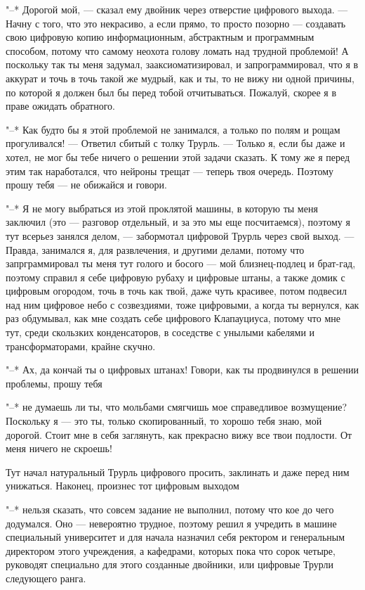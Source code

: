 "--* Дорогой мой, --- сказал ему двойник через отверстие
цифрового выхода. --- Начну с того, что это некрасиво, а если
прямо, то просто позорно --- создавать свою цифровую копию
информационным, абстрактным и программным способом, потому
что самому неохота голову ломать над трудной проблемой! А
поскольку так ты меня задумал, зааксиоматизировал, и
запрограммировал, что я в аккурат и точь в точь такой же
мудрый, как и ты, то не вижу ни одной причины, по которой я
должен был бы перед тобой отчитываться. Пожалуй, скорее я в
праве ожидать обратного.

"--* Как будто бы я этой проблемой не занимался, а только
по полям и рощам прогуливался! --- Ответил сбитый с толку
Трурль. --- Только я, если бы даже и хотел, не мог бы тебе
ничего о решении этой задачи сказать. К тому же я перед этим
так наработался, что нейроны трещат --- теперь твоя очередь.
Поэтому прошу тебя --- не обижайся и говори.

"--* Я не могу выбраться из этой проклятой машины, в
которую ты меня заключил (это --- разговор отдельный, и за это
мы еще посчитаемся), поэтому я тут всерьез занялся делом, --- забормотал
цифровой Трурль через свой выход. --- Правда,
занимался я, для развлечения, и другими делами, потому что
запрграммировал ты меня тут голого и босого --- мой
близнец-подлец и брат-гад, поэтому справил я себе цифровую
рубаху и цифровые штаны, а также домик с цифровым огородом,
точь в точь как твой, даже чуть красивее, потом подвесил над
ним цифровое небо с созвездиями, тоже цифровыми, а когда ты
вернулся, как раз обдумывал, как мне создать себе цифрового
Клапауциуса, потому что мне тут, среди скользких
конденсаторов, в соседстве с унылыми кабелями и
трансформаторами, крайне скучно.

"--* Ах, да кончай ты о цифровых штанах! Говори, как ты
продвинулся в решении проблемы, прошу тебя

"--* не думаешь ли ты, что мольбами смягчишь мое
справедливое возмущение? Поскольку я --- это ты, только
скопированный, то хорошо тебя знаю, мой дорогой. Стоит мне в
себя заглянуть, как прекрасно вижу все твои подлости. От
меня ничего не скроешь!

Тут начал натуральный Трурль цифрового просить, заклинать
и даже перед ним унижаться. Наконец, произнес тот цифровым
выходом

"--* нельзя сказать, что совсем задание не выполнил, потому
что кое до чего додумался. Оно --- невероятно трудное, поэтому
решил я учредить в машине специальный университет и для
начала назначил себя ректором и генеральным директором этого
учреждения, а кафедрами, которых пока что сорок четыре,
руководят специально для этого созданные двойники, или
цифровые Трурли следующего ранга.

